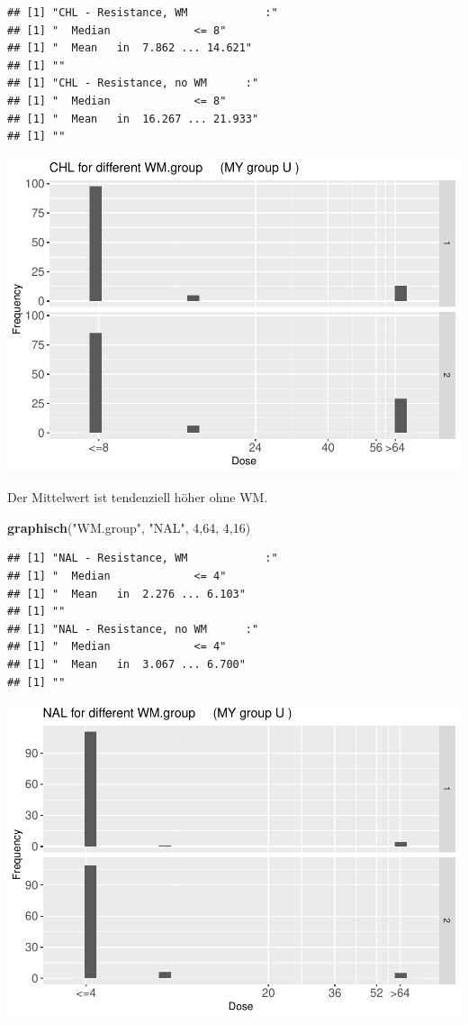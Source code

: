 \documentclass[
]{article}
\newenvironment{Shaded}{\begin{snugshade}}{\end{snugshade}}
\newcommand{\DecValTok}[1]{\textcolor[rgb]{0.00,0.00,0.81}{#1}}
\newcommand{\KeywordTok}[1]{\textcolor[rgb]{0.13,0.29,0.53}{\textbf{#1}}}
\newcommand{\NormalTok}[1]{#1}
\newcommand{\StringTok}[1]{\textcolor[rgb]{0.31,0.60,0.02}{#1}}
\begin{document}
\begin{verbatim}
## [1] "CHL - Resistance, WM            :"
## [1] "  Median             <= 8"
## [1] "  Mean   in  7.862 ... 14.621"
## [1] ""
## [1] "CHL - Resistance, no WM      :"
## [1] "  Median             <= 8"
## [1] "  Mean   in  16.267 ... 21.933"
## [1] ""
\end{verbatim}

\includegraphics{Verteilungen_files/figure-latex/unnamed-chunk-39-1.pdf}

Der Mittelwert ist tendenziell höher ohne WM.

\begin{Shaded}
\begin{Highlighting}[]
  \KeywordTok{graphisch}\NormalTok{(}\StringTok{"WM.group"}\NormalTok{, }\StringTok{"NAL"}\NormalTok{, }\DecValTok{4}\NormalTok{,}\DecValTok{64}\NormalTok{, }\DecValTok{4}\NormalTok{,}\DecValTok{16}\NormalTok{) }
\end{Highlighting}
\end{Shaded}

\begin{verbatim}
## [1] "NAL - Resistance, WM            :"
## [1] "  Median             <= 4"
## [1] "  Mean   in  2.276 ... 6.103"
## [1] ""
## [1] "NAL - Resistance, no WM      :"
## [1] "  Median             <= 4"
## [1] "  Mean   in  3.067 ... 6.700"
## [1] ""
\end{verbatim}

\includegraphics{Verteilungen_files/figure-latex/unnamed-chunk-40-1.pdf}
\end{document}
